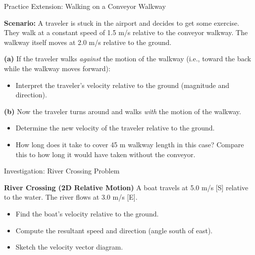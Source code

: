 \documentclass{beamer}
\begin{document}
\begin{frame}{Practice Extension: Walking on a Conveyor Walkway}

\textbf{Scenario:}  
A traveler is stuck in the airport and decides to get some exercise. They walk at a constant speed of 1.5 m/s relative to the conveyor walkway. The walkway itself moves at 2.0 m/s relative to the ground.

\vspace{0.4cm}

\textbf{(a)}
If the traveler walks \emph{against} the motion of the walkway (i.e., toward the back while the walkway moves forward):
\begin{itemize}
    \item Interpret the traveler’s velocity relative to the ground (magnitude and direction).
\end{itemize}

\vspace{0.4cm}

\textbf{(b)} Now the traveler turns around and walks \emph{with} the motion of the walkway.
\begin{itemize}
    \item Determine the new velocity of the traveler relative to the ground.
    \item How long does it take to cover 45 m walkway length in this case? Compare this to how long it would have taken without the conveyor. 
\end{itemize}

\end{frame}
\begin{frame}{Investigation: River Crossing Problem}


\vspace{0.4cm}

\textbf{River Crossing (2D Relative Motion)}  
A boat travels at 5.0 m/s [S] relative to the water. The river flows at 3.0 m/s [E].  
\begin{itemize}
    \item Find the boat’s velocity relative to the ground.
    \item Compute the resultant speed and direction (angle south of east).
    \item Sketch the velocity vector diagram.
\end{itemize}

\end{frame}
\end{document}
